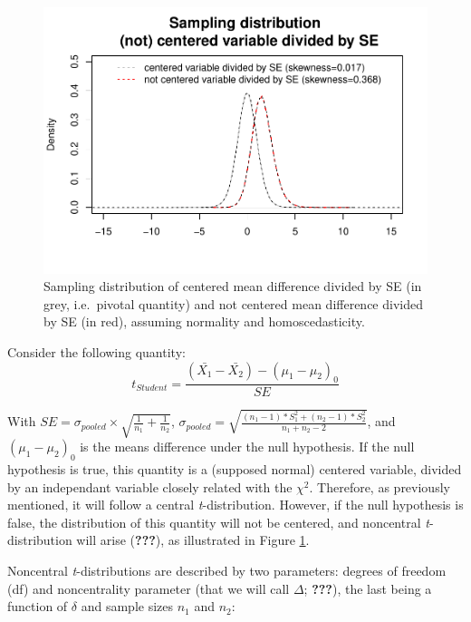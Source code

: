 \documentclass[
  man,floatsintext]{apa6}
\begin{document}
\begin{figure}
\centering
\includegraphics{Appendix2_files/figure-latex/SAMPLMEANDIFF3-1.pdf}
\caption{\label{fig:SAMPLMEANDIFF3}Sampling distribution of centered mean difference divided by SE (in grey, i.e.~pivotal quantity) and not centered mean difference divided by SE (in red), assuming normality and homoscedasticity.}
\end{figure}

Consider the following quantity:
\begin{equation} 
t_{Student}=\frac{(\bar{X_1}-\bar{X_2})-(\mu_1-\mu_2)_0}{SE}
\label{eq:plausiblelimit2}
\end{equation}

With \(SE = \sigma_{pooled} \times \sqrt{\frac{1}{n_1}+\frac{1}{n_2}}\), \(\sigma_{pooled} = \sqrt{\frac{(n_1-1)*S^2_1+(n_2-1)*S^2_2}{n_1+n_2-2}}\), and \((\mu_1-\mu_2)_0\) is the means difference under the null hypothesis. If the null hypothesis is true, this quantity is a (supposed normal) centered variable, divided by an independant variable closely related with the \(\chi^2\). Therefore, as previously mentioned, it will follow a central \emph{t}-distribution. However, if the null hypothesis is false, the distribution of this quantity will not be centered, and noncentral \emph{t}-distribution will arise ({\textbf{???}}), as illustrated in Figure \ref{fig:SAMPLMEANDIFF3}.

Noncentral \emph{t}-distributions are described by two parameters: degrees of freedom (df) and noncentrality parameter (that we will call \(\Delta\); {\textbf{???}}), the last being a function of \(\delta\) and sample sizes \(n_1\) and \(n_2\):
\end{document}
